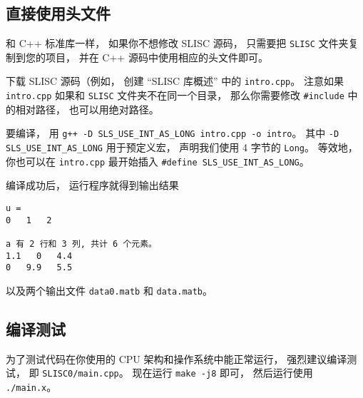 
\begin{issues}
\issueDraft
\end{issues}


\subsection{直接使用头文件}
和 C++ 标准库一样， 如果你不想修改 SLISC 源码， 只需要把 \verb|SLISC| 文件夹复制到您的项目， 并在 C++ 源码中使用相应的头文件即可。

下载 SLISC 源码（例如， 创建 “SLISC 库概述” 中的 \verb|intro.cpp|。 注意如果 \verb|intro.cpp| 如果和 \verb|SLISC| 文件夹不在同一个目录， 那么你需要修改 \verb|#include| 中的相对路径， 也可以用绝对路径。

要编译， 用 \verb|g++ -D SLS_USE_INT_AS_LONG intro.cpp -o intro|。 其中 \verb|-D SLS_USE_INT_AS_LONG| 用于预定义宏， 声明我们使用 4 字节的 \verb|Long|。 等效地， 你也可以在 \verb|intro.cpp| 最开始插入 \verb|#define SLS_USE_INT_AS_LONG|。

编译成功后， 运行程序就得到输出结果
\begin{lstlisting}[language=none]
u = 
0   1   2   

a 有 2 行和 3 列, 共计 6 个元素。
1.1   0   4.4   
0   9.9   5.5
\end{lstlisting}
以及两个输出文件 \verb|data0.matb| 和 \verb|data.matb|。

\subsection{编译测试}
为了测试代码在你使用的 CPU 架构和操作系统中能正常运行， 强烈建议编译测试， 即 \verb|SLISC0/main.cpp|。 现在运行 \verb|make -j8| 即可， 然后运行使用 \verb|./main.x|。
